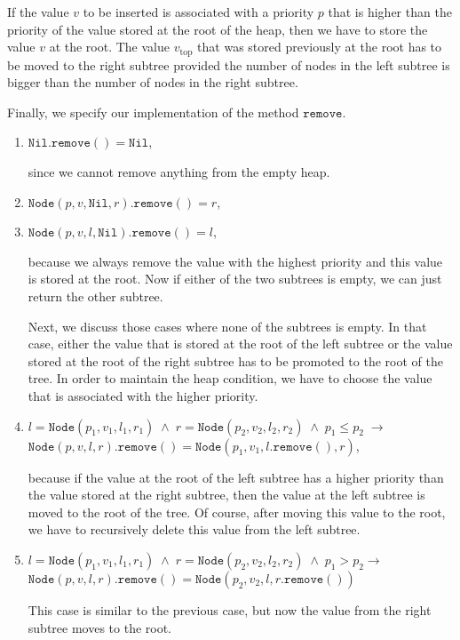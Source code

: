 \begin{enumerate}
      If the value $v$ to be inserted is associated with a priority $p$ that is higher than the priority of
      the value stored at the root of the heap, then we have to store the value $v$ at the root.
      The value $v_\mathrm{top}$ that was stored previously at the root has to be moved to 
      the right subtree provided the number of nodes in the left subtree is bigger than
      the number of nodes in the right subtree.
\end{enumerate}
Finally, we specify our implementation of the method $\mathtt{remove}$.
\begin{enumerate}
\item $\mathtt{Nil}.\mathtt{remove}() = \mathtt{Nil}$,

      since we cannot remove anything from the empty heap.
\item $\mathtt{Node}(p,v,\mathtt{Nil},r).\mathtt{remove}() = r$,
  
\item $\mathtt{Node}(p,v,l,\mathtt{Nil}).\mathtt{remove}() = l$,

      because we always remove the value with the highest priority and this value is stored at the
      root.  Now if either of the two subtrees is empty, we can just return the other subtree.

      Next, we discuss those cases where none of the subtrees is empty.
      In that case, either the value that is stored at the root of the left subtree or the value
      stored at the root of the right subtree has to be promoted to the root of the tree.
      In order to maintain the heap condition, we have to choose the value that is associated with the
      higher priority.
\item $l = \mathtt{Node}(p_1,v_1,l_1,r_1) \;\wedge\; r = \mathtt{Node}(p_2,v_2,l_2,r_2) \;\wedge\; p_1 \leq p_2 \;\rightarrow$ \\[0.1cm] 
      \hspace*{1.3cm} 
      $\mathtt{Node}(p,v,l,r).\mathtt{remove}() =      \mathtt{Node}(p_1,v_1,l.\mathtt{remove}(),r)$,

      because if the value at the root of the left subtree has a higher priority than the value
      stored at the right subtree, then the value at the left subtree is moved to the root of the tree.
      Of course, after moving this value to the root, we have to recursively delete this value from
      the left subtree.
\item $l = \mathtt{Node}(p_1,v_1,l_1,r_1) \;\wedge\; r = \mathtt{Node}(p_2,v_2,l_2,r_2) \;\wedge\; p_1 > p_2 \rightarrow$ \\[0.1cm]
      \hspace*{1.3cm} 
      $\mathtt{Node}(p,v,l,r).\mathtt{remove}() = \mathtt{Node}(p_2,v_2,l,r.\mathtt{remove}())$

      This case is similar to the previous case, but now the value from the right subtree moves to
      the root.
\end{enumerate}
